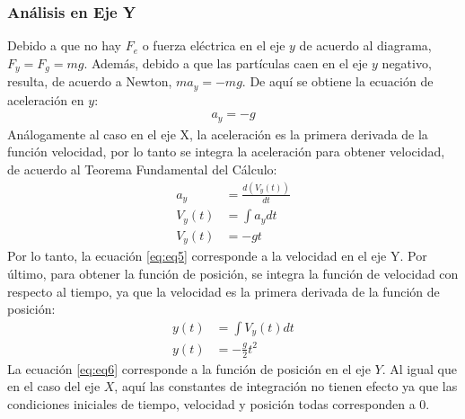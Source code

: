 \documentclass[12pt, letterpaper]{report}
\begin{document}
\subsubsection*{Análisis en Eje Y}
Debido a que no hay $F_e$ o fuerza eléctrica en el eje $y$ de acuerdo al diagrama, $F_y = F_g = mg$. Además, debido a que las partículas caen en 
el eje $y$ negativo, resulta, de acuerdo a Newton, $ma_y = -mg$. De aquí se obtiene la ecuación de aceleración en $y$:
\begin{align}
a_y = -g
\label{eq:eq4}
\end{align}
Análogamente al caso en el eje X, la aceleración es la primera derivada de la función velocidad, por lo tanto se integra la aceleración para obtener velocidad, de acuerdo al Teorema 
Fundamental del Cálculo: 
\begin{align}
a_y &= \frac{d(V_y(t))}{dt} \\
V_y(t) &= \int a_ydt \\
V_y(t) &= -gt
\label{eq:eq5}
\end{align}
Por lo tanto, la ecuación \ref{eq:eq5} corresponde a la velocidad en el eje Y. 
Por último, para obtener la función de posición, se integra la función de velocidad con respecto al tiempo, ya que 
la velocidad es la primera derivada de la función de posición: 
\begin{align}
y(t) &= \int V_y(t)dt \\
y(t) &= -\frac{g}{2}t^2
\label{eq:eq6}
\end{align}
La ecuación \ref{eq:eq6} corresponde a la función de posición en el eje $Y$. Al igual que en el caso del eje $X$, aquí 
las constantes de integración no tienen efecto ya que las condiciones iniciales de tiempo, velocidad y posición todas corresponden a 0. 
\end{document}

